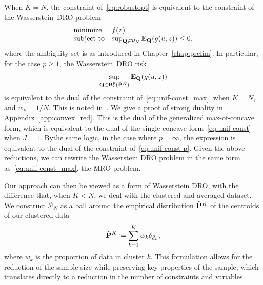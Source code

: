 {When $K=N$, the constraint of~\eqref{eq:robustopt} is equivalent to the constraint of the Wasserstein~\gls{DRO} problem
\begin{equation}
	\label{eq:dro_prob}
	\begin{array}{ll}
		\mbox{minimize} & f(z)\\
		\mbox{subject to} &   \sup_{\mathbf{Q}\in \mathcal{P}_N} \mathbf{E}_\mathbf{Q}(g(u,z))  \le 0,
	\end{array}
	\end{equation}
where the ambiguity set is as introduced in Chapter~\ref{chap:prelim}.
In particular, for the case $p \geq 1$, the Wasserstein~\gls{DRO} risk
\begin{equation}
\label{eq:dro-reduct}
\begin{aligned}
    \sup_{\mathbf{Q}\in \mathbf{B}_\epsilon^p(\hat{{\mathbf P}}^N)} \mathbf{E}_\mathbf{Q}(g(u,z))
	\end{aligned}
\end{equation}
is equivalent to the dual of the constraint of~\eqref{eq:unif-const_max}, when $K = N$, and $w_k = 1/N$. 
This is noted in~\citep{kuhn2019wasserstein,zhen2021mathematical}.
We give a proof of strong duality in Appendix~\ref{app:convex_red}.
This is the dual of the generalized max-of-concave form, which is equivalent to the dual of the single concave form~\eqref{eq:unif-const} when $J = 1$. 
Bythe same logic, in the case where $p = \infty$, the expression is equivalent to the dual of the constraint of~\eqref{eq:unif-const-p}.
Given the above reductions, we can rewrite the Wasserstein \gls{DRO} problem in the same form as~\eqref{eq:unif-const_max}, the \gls{MRO} problem.

Our approach can then be viewed as a form of Wasserstein \gls{DRO}, with the difference that, when $K<N$, we deal with the clustered and averaged dataset.
We construct $\mathcal{P}_N$ as a ball around the empirical distribution $\hat{{\mathbf P}}^K$ of the centroids of our clustered data
\begin{equation*}
\hat{{\mathbf P}}^K \coloneqq \sum_{k=1}^K w_k\delta_{\bar{d}_k},
\end{equation*}
where $w_k$ is the proportion of data in cluster $k$.
This formulation allows for the reduction of the sample size while preserving key properties of the sample, which translates directly to a reduction in the number of constraints and variables.

}
